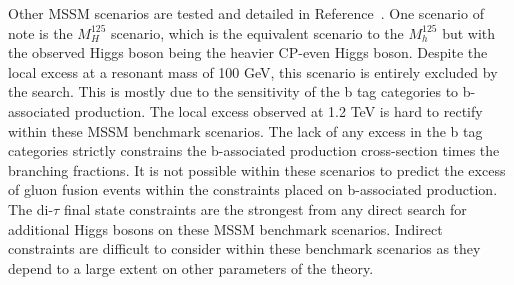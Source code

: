 Other \ac{MSSM} scenarios are tested and detailed in Reference~\cite{CMS:2022rbd}.
One scenario of note is the $M_{H}^{125}$ scenario, which is the equivalent scenario to the $M_{h}^{125}$ but with the observed Higgs boson being the heavier \ac{CP}-even Higgs boson.
Despite the local excess at a resonant mass of 100 GeV, this scenario is entirely excluded by the search. 
This is mostly due to the sensitivity of the b tag categories to b-associated production.
The local excess observed at 1.2 TeV is hard to rectify within these \ac{MSSM} benchmark scenarios.
The lack of any excess in the b tag categories strictly constrains the b-associated production cross-section times the branching fractions.
It is not possible within these scenarios to predict the excess of gluon fusion events within the constraints placed on b-associated production. \\

The di-$\tau$ final state constraints are the strongest from any direct search for additional Higgs bosons on these MSSM benchmark scenarios.
Indirect constraints are difficult to consider within these benchmark scenarios as they depend to a large extent on other parameters of the theory. \\

